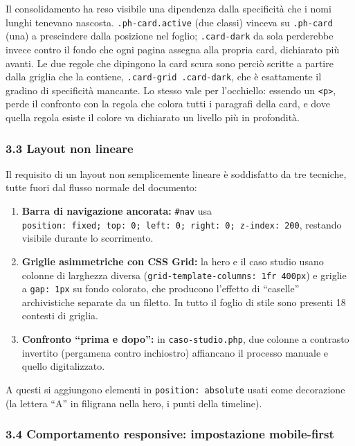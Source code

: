 \documentclass[
  11pt,
]{article}
\providecommand{\tightlist}{%
  \setlength{\itemsep}{0pt}\setlength{\parskip}{0pt}}
\begin{document}
Il consolidamento ha reso visibile una dipendenza dalla specificità che
i nomi lunghi tenevano nascosta. \texttt{.ph-card.active} (due classi)
vinceva su \texttt{.ph-card} (una) a prescindere dalla posizione nel
foglio; \texttt{.card-dark} da sola perderebbe invece contro il fondo
che ogni pagina assegna alla propria card, dichiarato più avanti. Le due
regole che dipingono la card scura sono perciò scritte a partire dalla
griglia che la contiene, \texttt{.card-grid\ .card-dark}, che è
esattamente il gradino di specificità mancante. Lo stesso vale per
l'occhiello: essendo un \texttt{\textless{}p\textgreater{}}, perde il
confronto con la regola che colora tutti i paragrafi della card, e dove
quella regola esiste il colore va dichiarato un livello più in
profondità.

\hypertarget{layout-non-lineare}{%
\subsubsection{3.3 Layout non lineare}\label{layout-non-lineare}}

Il requisito di un layout non semplicemente lineare è soddisfatto da tre
tecniche, tutte fuori dal flusso normale del documento:

\begin{enumerate}
\def\labelenumi{\arabic{enumi}.}
\tightlist
\item
  \textbf{Barra di navigazione ancorata:} \texttt{\#nav} usa
  \texttt{position:\ fixed;\ top:\ 0;\ left:\ 0;\ right:\ 0;\ z-index:\ 200},
  restando visibile durante lo scorrimento.
\item
  \textbf{Griglie asimmetriche con CSS Grid:} la hero e il caso studio
  usano colonne di larghezza diversa
  (\texttt{grid-template-columns:\ 1fr\ 400px}) e griglie a
  \texttt{gap:\ 1px} su fondo colorato, che producono l'effetto di
  ``caselle'' archivistiche separate da un filetto. In tutto il foglio
  di stile sono presenti 18 contesti di griglia.
\item
  \textbf{Confronto ``prima e dopo'':} in \texttt{caso-studio.php}, due
  colonne a contrasto invertito (pergamena contro inchiostro) affiancano
  il processo manuale e quello digitalizzato.
\end{enumerate}

A questi si aggiungono elementi in \texttt{position:\ absolute} usati
come decorazione (la lettera ``A'' in filigrana nella hero, i punti
della timeline).

\hypertarget{comportamento-responsive-impostazione-mobile-first}{%
\subsubsection{3.4 Comportamento responsive: impostazione
mobile-first}\label{comportamento-responsive-impostazione-mobile-first}}
\end{document}
